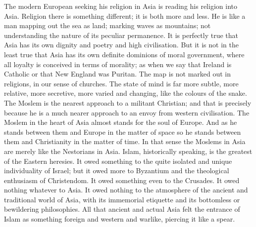 The modern European seeking his religion in Asia is reading his religion into Asia. Religion there is something different; it is both more and less. He is like a man mapping out the sea as land; marking waves as mountains; not understanding the nature of its peculiar permanence. It is perfectly true that Asia has its own dignity and poetry and high civilisation. But it is not in the least true that Asia has its own definite dominions of moral government, where all loyalty is conceived in terms of morality; as when we say that Ireland is Catholic or that New England was Puritan. The map is not marked out in religions, in our sense of churches. The state of mind is far more subtle, more relative, more secretive, more varied and changing, like the colours of the snake. The Moslem is the nearest approach to a militant Christian; and that is precisely because he is a much nearer approach to an envoy from western civilisation. The Moslem in the heart of Asia almost stands for the soul of Europe. And as he stands between them and Europe in the matter of space so he stands between them and Christianity in the matter of time. In that sense the Moslems in Asia are merely like the Nestorians in Asia. Islam, historically speaking, is the greatest of the Eastern heresies. It owed something to the quite isolated and unique individuality of Israel; but it owed more to Byzantium and the theological enthusiasm of Christendom. It owed something even to the Crusades. It owed nothing whatever to Asia. It owed nothing to the atmosphere of the ancient and traditional world of Asia, with its immemorial etiquette and its bottomless or bewildering philosophies. All that ancient and actual Asia felt the entrance of Islam as something foreign and western and warlike, piercing it like a spear.

